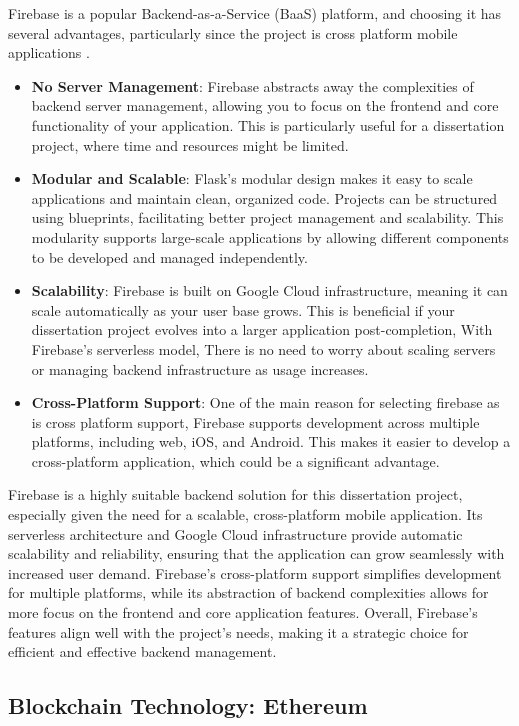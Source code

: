 Firebase is a popular Backend-as-a-Service (BaaS) platform, and choosing it has  several advantages, particularly since the project is cross platform mobile applications \cite{firebase}. 

\begin{itemize}
    \item \textbf{No Server Management}: Firebase abstracts away the complexities of backend server management, allowing you to focus on the frontend and core functionality of your application. This is particularly useful for a dissertation project, where time and resources might be limited.
    \item \textbf{Modular and Scalable}: Flask's modular design makes it easy to scale applications and maintain clean, organized code. Projects can be structured using blueprints, facilitating better project management and scalability. This modularity supports large-scale applications by allowing different components to be developed and managed independently.
    \item \textbf{Scalability}: Firebase is built on Google Cloud infrastructure, meaning it can scale automatically as your user base grows. This is beneficial if your dissertation project evolves into a larger application post-completion, With Firebase’s serverless model, There is no need to worry about scaling servers or managing backend infrastructure as usage increases.
    \item \textbf{Cross-Platform Support}: One of the main reason for selecting firebase as is cross platform support, Firebase supports development across multiple platforms, including web, iOS, and Android. This makes it easier to develop a cross-platform application, which could be a significant advantage.
\end{itemize}
Firebase is a highly suitable backend solution for this dissertation project, especially given the need for a scalable, cross-platform mobile application. Its serverless architecture and Google Cloud infrastructure provide automatic scalability and reliability, ensuring that the application can grow seamlessly with increased user demand. Firebase’s cross-platform support simplifies development for multiple platforms, while its abstraction of backend complexities allows for more focus on the frontend and core application features. Overall, Firebase’s features align well with the project's needs, making it a strategic choice for efficient and effective backend management.

\subsection{Blockchain Technology: Ethereum}

